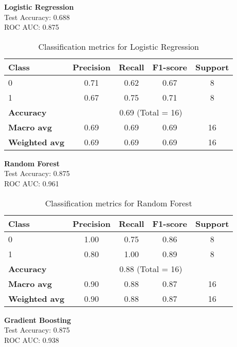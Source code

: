 \documentclass{article}
\begin{document}
\textbf{Logistic Regression} \\
Test Accuracy: 0.688 \\
ROC AUC: 0.875

\begin{table}[H]
\centering
\begin{tabular}{|l|c|c|c|c|}
\hline
\textbf{Class} & \textbf{Precision} & \textbf{Recall} & \textbf{F1-score} & \textbf{Support} \\
\hline
0 & 0.71 & 0.62 & 0.67 & 8 \\
1 & 0.67 & 0.75 & 0.71 & 8 \\
\hline
\textbf{Accuracy} & \multicolumn{4}{c|}{0.69 (Total = 16)} \\
\textbf{Macro avg} & 0.69 & 0.69 & 0.69 & 16 \\
\textbf{Weighted avg} & 0.69 & 0.69 & 0.69 & 16 \\
\hline
\end{tabular}
\caption{Classification metrics for Logistic Regression}
\end{table}

\vspace{1em}

\textbf{Random Forest} \\
Test Accuracy: 0.875 \\
ROC AUC: 0.961

\begin{table}[H]
\centering
\begin{tabular}{|l|c|c|c|c|}
\hline
\textbf{Class} & \textbf{Precision} & \textbf{Recall} & \textbf{F1-score} & \textbf{Support} \\
\hline
0 & 1.00 & 0.75 & 0.86 & 8 \\
1 & 0.80 & 1.00 & 0.89 & 8 \\
\hline
\textbf{Accuracy} & \multicolumn{4}{c|}{0.88 (Total = 16)} \\
\textbf{Macro avg} & 0.90 & 0.88 & 0.87 & 16 \\
\textbf{Weighted avg} & 0.90 & 0.88 & 0.87 & 16 \\
\hline
\end{tabular}
\caption{Classification metrics for Random Forest}
\end{table}

\vspace{1em}

\textbf{Gradient Boosting} \\
Test Accuracy: 0.875 \\
ROC AUC: 0.938
\end{document}
